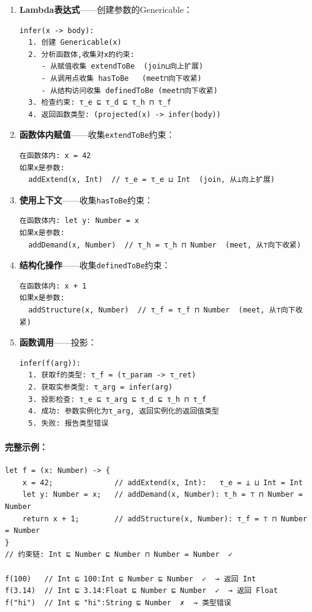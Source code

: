 \documentclass[UTF8]{article}
\begin{document}
\begin{enumerate}[leftmargin=2em]
\item \textbf{Lambda表达式}——创建参数的Genericable：
\begin{lstlisting}[language={}]
infer(x -> body):
  1. 创建 Genericable(x)
  2. 分析函数体,收集对x的约束:
     - 从赋值收集 extendToBe  (join⊔向上扩展)
     - 从调用点收集 hasToBe   (meet⊓向下收紧)
     - 从结构访问收集 definedToBe (meet⊓向下收紧)
  3. 检查约束: τ_e ⊑ τ_d ⊑ τ_h ⊓ τ_f
  4. 返回函数类型: (projected(x) -> infer(body))
\end{lstlisting}

\item \textbf{函数体内赋值}——收集\texttt{extendToBe}约束：
\begin{lstlisting}[language={}]
在函数体内: x = 42
如果x是参数:
  addExtend(x, Int)  // τ_e = τ_e ⊔ Int  (join, 从⊥向上扩展)
\end{lstlisting}

\item \textbf{使用上下文}——收集\texttt{hasToBe}约束：
\begin{lstlisting}[language={}]
在函数体内: let y: Number = x
如果x是参数:
  addDemand(x, Number)  // τ_h = τ_h ⊓ Number  (meet, 从⊤向下收紧)
\end{lstlisting}

\item \textbf{结构化操作}——收集\texttt{definedToBe}约束：
\begin{lstlisting}[language={}]
在函数体内: x + 1
如果x是参数:
  addStructure(x, Number)  // τ_f = τ_f ⊓ Number  (meet, 从⊤向下收紧)
\end{lstlisting}

\item \textbf{函数调用}——投影：
\begin{lstlisting}[language={}]
infer(f(arg)):
  1. 获取f的类型: τ_f = (τ_param -> τ_ret)
  2. 获取实参类型: τ_arg = infer(arg)
  3. 投影检查: τ_e ⊑ τ_arg ⊑ τ_d ⊑ τ_h ⊓ τ_f
  4. 成功: 参数实例化为τ_arg, 返回实例化的返回值类型
  5. 失败: 报告类型错误
\end{lstlisting}
\end{enumerate}

\paragraph{完整示例：}

\begin{lstlisting}[language={}]
let f = (x: Number) -> {
    x = 42;              // addExtend(x, Int):   τ_e = ⊥ ⊔ Int = Int
    let y: Number = x;   // addDemand(x, Number): τ_h = ⊤ ⊓ Number = Number
    return x + 1;        // addStructure(x, Number): τ_f = ⊤ ⊓ Number = Number
}
// 约束链: Int ⊑ Number ⊑ Number ⊓ Number = Number  ✓

f(100)   // Int ⊑ 100:Int ⊑ Number ⊑ Number  ✓  → 返回 Int
f(3.14)  // Int ⊑ 3.14:Float ⊑ Number ⊑ Number  ✓  → 返回 Float
f("hi")  // Int ⊑ "hi":String ⊑ Number  ✗  → 类型错误
\end{lstlisting}
\end{document}
